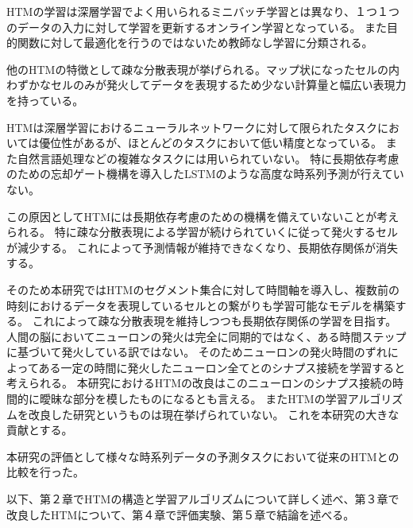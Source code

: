 HTMの学習は深層学習でよく用いられるミニバッチ学習とは異なり、１つ１つのデータの入力に対して学習を更新するオンライン学習となっている。
また目的関数に対して最適化を行うのではないため教師なし学習に分類される。

他のHTMの特徴として疎な分散表現が挙げられる。マップ状になったセルの内わずかなセルのみが発火してデータを表現するため少ない計算量と幅広い表現力を持っている。

HTMは深層学習におけるニューラルネットワークに対して限られたタスクにおいては優位性があるが、ほとんどのタスクにおいて低い精度となっている。
また自然言語処理などの複雑なタスクには用いられていない。
特に長期依存考慮のための忘却ゲート機構を導入したLSTM\cite{lstm_forget_gate}のような高度な時系列予測が行えていない。

この原因としてHTMには長期依存考慮のための機構を備えていないことが考えられる。
特に疎な分散表現による学習が続けられていくに従って発火するセルが減少する。
これによって予測情報が維持できなくなり、長期依存関係が消失する。

そのため本研究ではHTMのセグメント集合に対して時間軸を導入し、複数前の時刻におけるデータを表現しているセルとの繋がりも学習可能なモデルを構築する。
これによって疎な分散表現を維持しつつも長期依存関係の学習を目指す。
人間の脳においてニューロンの発火は完全に同期的ではなく、ある時間ステップに基づいて発火している訳ではない。
そのためニューロンの発火時間のずれによってある一定の時間に発火したニューロン全てとのシナプス接続を学習すると考えられる。
本研究におけるHTMの改良はこのニューロンのシナプス接続の時間的に曖昧な部分を模したものになるとも言える。
またHTMの学習アルゴリズムを改良した研究というものは現在挙げられていない。
これを本研究の大きな貢献とする。

本研究の評価として様々な時系列データの予測タスクにおいて従来のHTMとの比較を行った。

以下、第２章でHTMの構造と学習アルゴリズムについて詳しく述べ、第３章で改良したHTMについて、第４章で評価実験、第５章で結論を述べる。
